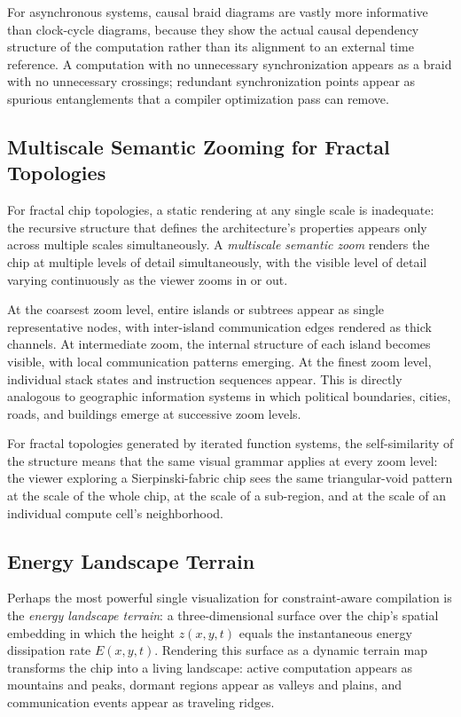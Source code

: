 \documentclass[11pt, a4paper]{article}
\begin{document}
For asynchronous systems, causal braid diagrams are vastly more informative than
clock-cycle diagrams, because they show the actual causal dependency structure
of the computation rather than its alignment to an external time reference.
A computation with no unnecessary synchronization appears as a braid with
no unnecessary crossings; redundant synchronization points appear as spurious
entanglements that a compiler optimization pass can remove.

\subsection{Multiscale Semantic Zooming for Fractal Topologies}

For fractal chip topologies, a static rendering at any single scale is inadequate:
the recursive structure that defines the architecture's properties appears only
across multiple scales simultaneously. A \emph{multiscale semantic zoom} renders
the chip at multiple levels of detail simultaneously, with the visible level of
detail varying continuously as the viewer zooms in or out.

At the coarsest zoom level, entire islands or subtrees appear as single
representative nodes, with inter-island communication edges rendered as thick
channels. At intermediate zoom, the internal structure of each island becomes
visible, with local communication patterns emerging. At the finest zoom level,
individual stack states and instruction sequences appear. This is directly
analogous to geographic information systems in which political boundaries,
cities, roads, and buildings emerge at successive zoom levels.

For fractal topologies generated by iterated function systems, the self-similarity
of the structure means that the same visual grammar applies at every zoom level:
the viewer exploring a Sierpinski-fabric chip sees the same triangular-void
pattern at the scale of the whole chip, at the scale of a sub-region, and at
the scale of an individual compute cell's neighborhood.

\subsection{Energy Landscape Terrain}

Perhaps the most powerful single visualization for constraint-aware compilation
is the \emph{energy landscape terrain}: a three-dimensional surface over the
chip's spatial embedding in which the height $z(x,y,t)$ equals the instantaneous
energy dissipation rate $E(x,y,t)$. Rendering this surface as a dynamic terrain
map transforms the chip into a living landscape: active computation appears as
mountains and peaks, dormant regions appear as valleys and plains, and
communication events appear as traveling ridges.
\end{document}
